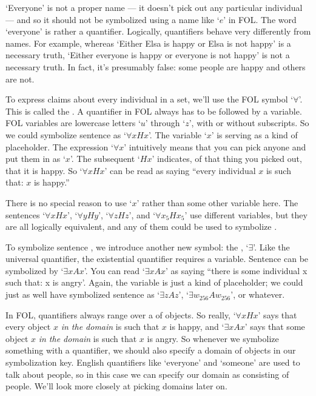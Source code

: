 `Everyone' is not a proper name --- it doesn't pick out any particular individual --- and so it should not be symbolized using a name like `$e$' in FOL.  The word `everyone' is rather a quantifier.  Logically, quantifiers behave very differently from names.  For example, whereas `Either Elsa is happy or Elsa is not happy' is a necessary truth, `Either everyone is happy or everyone is not happy' is not a necessary truth.  In fact, it's presumably false: some people are happy and others are not.

To express claims about every individual in a set, we'll use the FOL symbol `$\forall$'.  This is called the .  A quantifier in FOL always has to be followed by a variable. FOL variables are lowercase letters `$u$' through `$z$', with or without subscripts. So we could symbolize sentence  as `$\forall x Hx$'.  The variable `$x$' is serving as a kind of placeholder. The expression `$\forall x$' intuitively means that you can pick anyone and put them in as `$x$'. The subsequent `$Hx$' indicates, of that thing you picked out, that it is happy.  So `$\forall x Hx$' can be read as saying ``every individual $x$ is such that: $x$ is happy.''

There is no special reason to use `$x$' rather than some other variable here. The sentences `$\forall x Hx$', `$\forall y Hy$', `$\forall z Hz$', and `$\forall x_5 Hx_5$' use different variables, but they are all logically equivalent, and any of them could be used to symbolize .

To symbolize sentence , we introduce another new symbol: the , `$\exists$'. Like the universal quantifier, the existential quantifier requires a variable. Sentence  can be symbolized by `$\exists x Ax$'. You can read `$\exists x Ax$' as saying ``there is some individual x such that: x is angry'. Again, the variable is just a kind of placeholder; we could just as well have symbolized sentence  as `$\exists z Az$', `$\exists w_{256} Aw_{256}$', or whatever.


In FOL, quantifiers always range over a  of objects.  So really, `$\forall xHx$' says that every object $x$ \emph{in the domain} is such that $x$ is happy, and `$\exists xAx$' says that some object $x$ \emph{in the domain} is such that $x$ is angry.  So whenever we symbolize something with a quantifier, we should also specify a domain of objects in our symbolization key.  English quantifiers like `everyone' and `someone' are used to talk about people, so in this case we can specify our domain as consisting of people.  We'll look more closely at picking domains later on.



